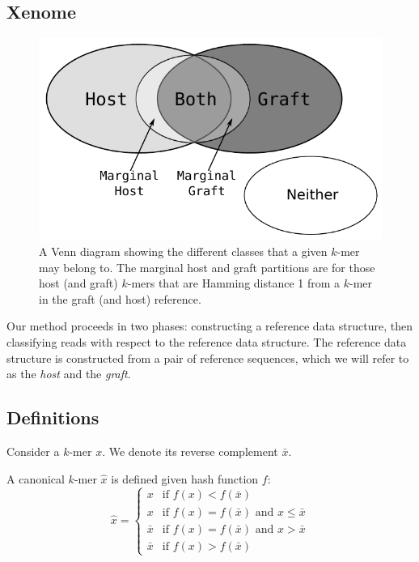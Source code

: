 \documentclass[twocolumn]{article}
\begin{document}
\subsection{Xenome}
\label{sec:xenome}

\begin{figure}
\label{fig:venn}
\caption{A Venn diagram showing the different classes that a given $k$-mer may
belong to.
The marginal host and graft partitions are for those host (and graft) $k$-mers
that are Hamming distance 1 from a $k$-mer in the graft (and host) reference.}
\begin{center}
\includegraphics[scale=0.7]{venn.pdf}
\end{center}
\end{figure}

Our method proceeds in two phases: constructing a reference data
structure, then classifying reads with respect to the reference data
structure.  The reference data structure is constructed from a pair of
reference sequences, which we will refer to as the \textit{host} and
the \textit{graft}.

\subsection{Definitions}
\label{sec:xenome:defs}

Consider a $k$-mer $x$. We denote its reverse complement $\bar{x}$.

A canonical $k$-mer $\hat{x}$ is defined given hash function $f$:
$$
\hat{x} =
\left\{
    \begin{array}{ll}
        x       & \mbox{if } \textit{f}(x) < \textit{f}(\bar{x}) \\
        x       & \mbox{if } \textit{f}(x) = \textit{f}(\bar{x}) \mbox{ and } x \le \bar{x} \\
        \bar{x} & \mbox{if } \textit{f}(x) = \textit{f}(\bar{x}) \mbox{ and } x > \bar{x} \\
        \bar{x} & \mbox{if } \textit{f}(x) > \textit{f}(\bar{x})
    \end{array}
\right.
$$
\end{document}
